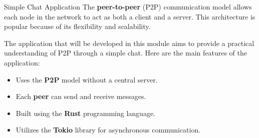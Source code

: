 \documentclass[aspectratio=169, table]{beamer}
\begin{document}
\begin{frame}{Simple Chat Application}
	\vspace{20pt}
	The \textbf{peer-to-peer} (P2P) communication model allows each node in the network to act as both a client and a server. This architecture is popular because of its flexibility and scalability.
	
	\vspace{10pt}
	The application that will be developed in this module aims to provide a practical understanding of P2P through a simple chat. Here are the main features of the application:
	
	\begin{itemize}
		\item Uses the \textbf{P2P} model without a central server.
		\item Each \textbf{peer} can send and receive messages.
		\item Built using the \textbf{Rust} programming language.
		\item Utilizes the \textbf{Tokio} library for asynchronous communication.
	\end{itemize}
	
\end{frame}
\end{document}
